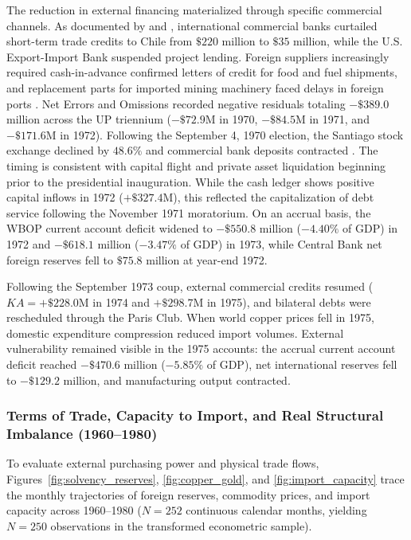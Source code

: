 The reduction in external financing materialized through specific commercial channels. As documented by \citet{DeVylder1976} and \citet{PetrasMorley1975}, international commercial banks curtailed short-term trade credits to Chile from $\$220$ million to $\$35$ million, while the U.S. Export-Import Bank suspended project lending. Foreign suppliers increasingly required cash-in-advance confirmed letters of credit for food and fuel shipments, and replacement parts for imported mining machinery faced delays in foreign ports \citep{Stallings1978}. Net Errors and Omissions recorded negative residuals totaling $-\$389.0$ million across the UP triennium ($-\$72.9$M in 1970, $-\$84.5$M in 1971, and $-\$171.6$M in 1972). Following the September 4, 1970 election, the Santiago stock exchange declined by $48.6\%$ and commercial bank deposits contracted \citep{GirardiBowles2018}. The timing is consistent with capital flight and private asset liquidation beginning prior to the presidential inauguration. While the cash ledger shows positive capital inflows in 1972 ($+\$327.4$M), this reflected the capitalization of debt service following the November 1971 moratorium. On an accrual basis, the WBOP current account deficit widened to $-\$550.8$ million ($-4.40\%$ of GDP) in 1972 and $-\$618.1$ million ($-3.47\%$ of GDP) in 1973, while Central Bank net foreign reserves fell to $\$75.8$ million at year-end 1972.

Following the September 1973 coup, external commercial credits resumed ($KA = +\$228.0$M in 1974 and $+\$298.7$M in 1975), and bilateral debts were rescheduled through the Paris Club. When world copper prices fell in 1975, domestic expenditure compression reduced import volumes. External vulnerability remained visible in the 1975 accounts: the accrual current account deficit reached $-\$470.6$ million ($-5.85\%$ of GDP), net international reserves fell to $-\$129.2$ million, and manufacturing output contracted.

\subsubsection{Terms of Trade, Capacity to Import, and Real Structural Imbalance (1960--1980)}
\label{sec:stylized_terms_of_trade}

To evaluate external purchasing power and physical trade flows, Figures~\ref{fig:solvency_reserves}, \ref{fig:copper_gold}, and \ref{fig:import_capacity} trace the monthly trajectories of foreign reserves, commodity prices, and import capacity across 1960--1980 ($N=252$ continuous calendar months, yielding $N=250$ observations in the transformed econometric sample).

